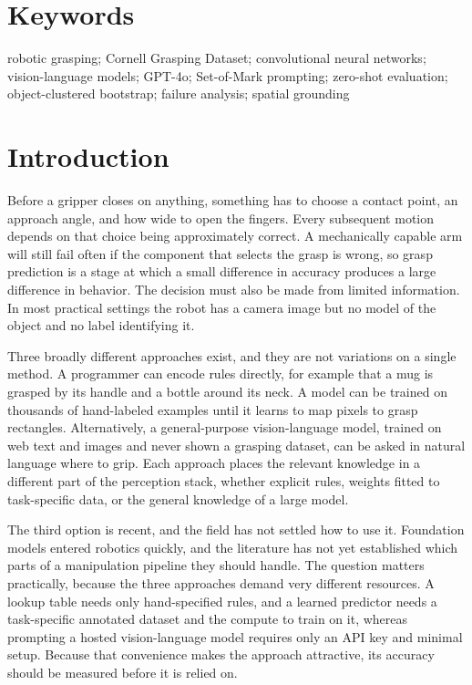 \documentclass[12pt,letterpaper]{article}
\begin{document}
\section*{Keywords}
robotic grasping; Cornell Grasping Dataset; convolutional neural networks;
vision-language models; GPT-4o; Set-of-Mark prompting; zero-shot evaluation;
object-clustered bootstrap; failure analysis; spatial grounding

\section{Introduction}

Before a gripper closes on anything, something has to choose a contact
point, an approach angle, and how wide to open the fingers. Every
subsequent motion depends on that choice being approximately correct. A
mechanically capable arm will still fail often if the component that
selects the grasp is wrong, so grasp prediction is a stage at which a
small difference in accuracy produces a large difference in behavior.
The decision must also be made from limited information. In most
practical settings the robot has a camera image but no model of the
object and no label identifying it.

Three broadly different approaches exist, and they are not variations on
a single method. A programmer can encode rules directly, for example
that a mug is grasped by its handle and a bottle around its neck. A
model can be trained on thousands of hand-labeled examples until it
learns to map pixels to grasp rectangles. Alternatively, a
general-purpose vision-language model, trained on web text and images
and never shown a grasping dataset, can be asked in natural language
where to grip. Each approach places the relevant knowledge in a
different part of the perception stack, whether explicit rules, weights
fitted to task-specific data, or the general knowledge of a large model.

The third option is recent, and the field has not settled how to use it.
Foundation models entered robotics quickly, and the literature has not
yet established which parts of a manipulation pipeline they should
handle. The question matters practically, because the three approaches
demand very different resources. A lookup table needs only
hand-specified rules, and a learned predictor needs a task-specific
annotated dataset and the compute to train on it, whereas prompting a
hosted vision-language model requires only an API key and minimal setup.
Because that convenience makes the approach attractive, its accuracy
should be measured before it is relied on.
\end{document}
